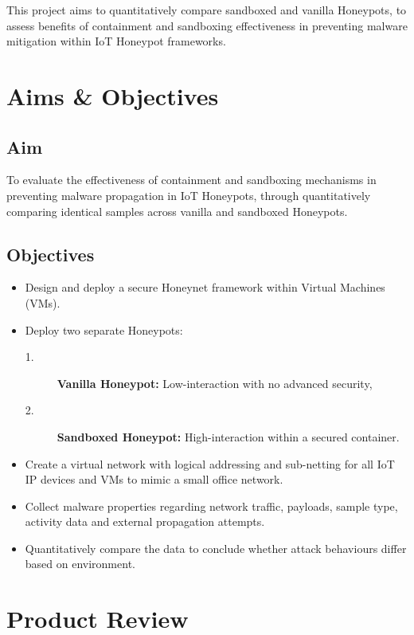 \documentclass[a4paper,12pt,oneside]{book}			%
\begin{document}
This project aims to quantitatively compare sandboxed and vanilla Honeypots, to assess benefits of containment and sandboxing effectiveness in preventing malware mitigation within IoT Honeypot frameworks. 


\section{Aims \&{} Objectives}\label{sec:aimAndObjectives}

\subsection{Aim}\label{sec:aim}

To evaluate the effectiveness of containment and sandboxing mechanisms in preventing malware propagation in IoT Honeypots, through quantitatively comparing identical samples across vanilla and sandboxed Honeypots.

\subsection{Objectives}\label{sec:objectives}
\begin{itemize}

\item Design and deploy a secure Honeynet framework within Virtual Machines (VMs).
\item Deploy two separate Honeypots:
\begin{description}
\item[1.] \textbf{Vanilla Honeypot:} Low-interaction with no advanced security,
\item[2.] \textbf{Sandboxed Honeypot:} High-interaction within a secured container.
\end{description}
\item Create a virtual network with logical addressing and sub-netting for all IoT IP devices and VMs to mimic a small office network.
\item Collect malware properties regarding network traffic, payloads, sample type, activity data and external propagation attempts.
\item Quantitatively compare the data to conclude whether attack behaviours differ based on environment. 
\end{itemize} 


\section{Product Review}\label{sec:productReview}
\end{document}
